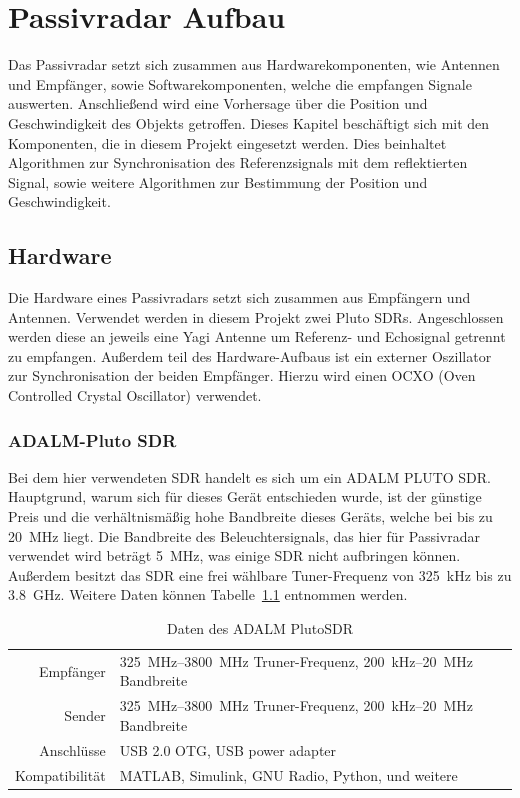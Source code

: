 \chapter{Passivradar Aufbau}\label{sct:setup}
Das Passivradar setzt sich zusammen aus Hardwarekomponenten, wie Antennen und Empfänger, sowie Softwarekomponenten, welche die empfangen Signale auswerten. Anschließend wird eine Vorhersage über die Position und Geschwindigkeit des Objekts getroffen. Dieses Kapitel beschäftigt sich mit den Komponenten, die in diesem Projekt eingesetzt werden. Dies beinhaltet Algorithmen zur Synchronisation des Referenzsignals mit dem reflektierten Signal, sowie weitere Algorithmen zur Bestimmung der Position und Geschwindigkeit.
\section{Hardware}
Die Hardware eines Passivradars setzt sich zusammen aus Empfängern und Antennen. Verwendet werden in diesem Projekt zwei Pluto SDRs. Angeschlossen werden diese an jeweils eine Yagi Antenne um Referenz- und Echosignal getrennt zu empfangen. Außerdem teil des Hardware-Aufbaus ist ein externer Oszillator zur Synchronisation der beiden Empfänger. Hierzu wird einen OCXO (Oven Controlled Crystal Oscillator) verwendet.
\subsection{ADALM-Pluto SDR}\label{sct:sdr}
Bei dem hier verwendeten SDR handelt es sich um ein ADALM
PLUTO SDR\@. Hauptgrund, warum sich für dieses Gerät entschieden wurde, ist der günstige Preis und die verhältnismäßig hohe Bandbreite dieses Geräts, welche bei bis zu \SI{20}{\mega\hertz} liegt. Die Bandbreite des Beleuchtersignals, das hier für Passivradar verwendet wird beträgt \SI{5}{\mega\hertz}, was einige SDR nicht aufbringen können. Außerdem besitzt das SDR eine frei wählbare Tuner-Frequenz von \SI{325}{\kilo\hertz} bis zu \SI{3.8}{\giga\hertz}. Weitere Daten können Tabelle~\ref{table:sdr} entnommen werden.

\begin{table}
    \centering
    \begin{tabular}[h]{rl}
        Empfänger & \SIrange{325}{3800}{\mega\hertz} Truner-Frequenz, \SI{200}{\kilo\hertz}--\SI{20}{\mega\hertz} Bandbreite \\
        Sender & \SIrange{325}{3800}{\mega\hertz} Truner-Frequenz, \SI{200}{\kilo\hertz}--\SI{20}{\mega\hertz} Bandbreite \\
        Anschlüsse & USB 2.0 OTG, USB power adapter \\
        Kompatibilität & MATLAB, Simulink, GNU Radio, Python, und weitere \\
    \end{tabular}
    \caption{Daten des ADALM PlutoSDR}\label{table:sdr}
\end{table}

